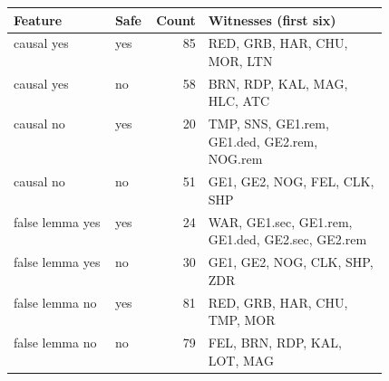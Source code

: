 \begin{center}\small
\begin{tabular}{@{}llrp{0.48\linewidth}@{}}\toprule
Feature & Safe & Count & Witnesses (first six) \\ \midrule
causal yes & yes & 85 & RED, GRB, HAR, CHU, MOR, LTN \\
causal yes & no & 58 & BRN, RDP, KAL, MAG, HLC, ATC \\
causal no & yes & 20 & TMP, SNS, GE1.rem, GE1.ded, GE2.rem, NOG.rem \\
causal no & no & 51 & GE1, GE2, NOG, FEL, CLK, SHP \\
\midrule
false lemma yes & yes & 24 & WAR, GE1.sec, GE1.rem, GE1.ded, GE2.sec, GE2.rem \\
false lemma yes & no & 30 & GE1, GE2, NOG, CLK, SHP, ZDR \\
false lemma no & yes & 81 & RED, GRB, HAR, CHU, TMP, MOR \\
false lemma no & no & 79 & FEL, BRN, RDP, KAL, LOT, MAG \\
\bottomrule\end{tabular}\end{center}
